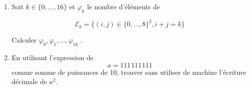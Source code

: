\begin{enumerate}
\item
Soit $k \in \{0,\ldots ,16\}$ et $\varphi_k$ le nombre d'{\'e}l{\'e}ments de

$${\mathcal{E}}_k = \{(i,j)\in\{0,\ldots , 8 \}^2,i+j=k\}$$

Calculer $\varphi_0, \varphi_1, \ldots , \varphi_{16}$ .
\item
En utilisant l'expression de $$a=111\hspace{1pt}111\hspace{1pt}111$$ comme somme de puissances de 10, trouver sans utiliser de machine l'{\'e}criture d{\'e}cimale de $a^2$.
\end{enumerate}
